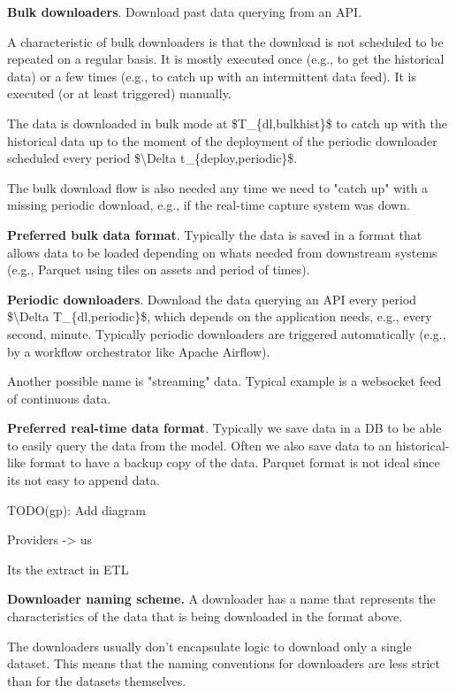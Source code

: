 \documentclass[11pt, reqno]{amsart}
\begin{document}
\textbf{Bulk downloaders}. Download past data querying from an API.

A characteristic of bulk downloaders is that the download is not
scheduled to be repeated on a regular basis. It is mostly executed once
(e.g., to get the historical data) or a few times (e.g., to catch up
with an intermittent data feed). It is executed (or at least triggered)
manually.

The data is downloaded in bulk mode at \$T\_\{dl,bulkhist\}\$ to catch
up with the historical data up to the moment of the deployment of the
periodic downloader scheduled every period \$\textbackslash Delta
t\_\{deploy,periodic\}\$.

The bulk download flow is also needed any time we need to "catch up"
with a missing periodic download, e.g., if the real-time capture system
was down.

\textbf{Preferred bulk data format}. Typically the data is saved in a
format that allows data to be loaded depending on what\textquotesingle s
needed from downstream systems (e.g., Parquet using tiles on assets and
period of times).

\textbf{Periodic downloaders}. Download the data querying an API every
period \$\textbackslash Delta T\_\{dl,periodic\}\$, which depends on the
application needs, e.g., every second, minute. Typically periodic
downloaders are triggered automatically (e.g., by a workflow
orchestrator like Apache Airflow).

Another possible name is "streaming" data. Typical example is a
websocket feed of continuous data.

\textbf{Preferred real-time data format}. Typically we save data in a DB
to be able to easily query the data from the model. Often we also save
data to an historical-like format to have a backup copy of the data.
Parquet format is not ideal since it\textquotesingle s not easy to
append data.

TODO(gp): Add diagram

Providers -\textgreater{} us

It\textquotesingle s the extract in ETL

\textbf{Downloader naming scheme.} A downloader has a name that
represents the characteristics of the data that is being downloaded in
the format above.

The downloaders usually don't encapsulate logic to download only a
single dataset. This means that the naming conventions for downloaders
are less strict than for the datasets themselves.
\end{document}
